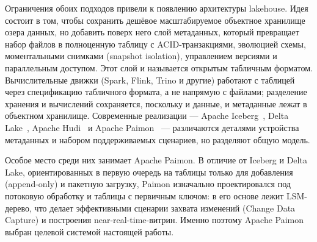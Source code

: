 Ограничения обоих подходов привели к появлению архитектуры lakehouse. Идея состоит
в том, чтобы сохранить дешёвое масштабируемое объектное хранилище озера данных, но
добавить поверх него слой метаданных, который превращает набор файлов в полноценную
таблицу с ACID-транзакциями, эволюцией схемы, моментальными снимками (snapshot
isolation), управлением версиями и параллельным доступом. Этот слой и называется
открытым табличным форматом. Вычислительные движки (Spark, Flink, Trino и
другие) работают с таблицей через спецификацию табличного формата, а не напрямую с
файлами; разделение хранения и вычислений сохраняется, поскольку и данные, и
метаданные лежат в объектном хранилище. Современные реализации --- Apache Iceberg~\cite{iceberg-spec},
Delta Lake~\cite{armbrust2020delta}, Apache Hudi~\cite{hudi-docs} и Apache Paimon~\cite{paimon-docs} --- различаются деталями устройства
метаданных и набором поддерживаемых сценариев, но разделяют общую модель.

Особое место среди них занимает Apache Paimon. В отличие от Iceberg и Delta Lake,
ориентированных в первую очередь на таблицы только для добавления (append-only) и
пакетную загрузку, Paimon изначально проектировался под потоковую обработку и
таблицы с первичным ключом: в его основе лежит LSM-дерево, что делает эффективными
сценарии захвата изменений (Change Data Capture) и построения near-real-time-витрин.
Именно поэтому Apache Paimon выбран целевой системой настоящей работы.
